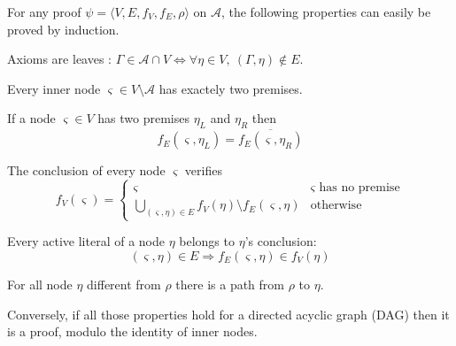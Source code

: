\documentclass{llncs}
\begin{document}
For any proof $\psi = \langle V,E,f_V,f_E,\rho \rangle$ on $\mathcal{A}$, the following properties
can easily be proved by induction.

\begin{property}
\label{prop:proof_leaf}
Axioms are leaves : $\Gamma \in \mathcal{A} \cap V \Leftrightarrow \forall \eta \in V ,~
(\Gamma,\eta) \notin E$.
\end{property}

\begin{property}
Every inner node $\varsigma \in V \setminus \mathcal{A}$ has exactely two premises.
\end{property}

\begin{property}
\label{prop:proof_edges}
If a node $\varsigma \in V$ has two premises $\eta_L$ and $\eta_R$ then
\begin{equation*}
f_E(\varsigma,\eta_L) = \overline{f_E(\varsigma,\eta_R)}
\end{equation*}
\end{property}

\begin{property}
\label{prop:proof_conclusion}
The conclusion of every node $\varsigma$ verifies
\begin{equation*}
  f_V(\varsigma) = \begin{cases}
    \varsigma & \varsigma \text{ has no premise} \\
    \bigcup_{(\varsigma,\eta) \in E}{f_V(\eta) \setminus f_E(\varsigma,\eta)} & \text{otherwise}
  \end{cases}
\end{equation*}
\end{property}

\begin{property}
Every active literal of a node $\eta$ belongs to $\eta$'s conclusion:
\begin{equation*}
  (\varsigma,\eta) \in E \Rightarrow f_E(\varsigma,\eta) \in f_V(\eta)
\end{equation*}
\end{property}

\begin{property}
For all node $\eta$ different from $\rho$ there is a path from $\rho$ to $\eta$.
\end{property}

Conversely, if all those properties hold for a directed acyclic graph (DAG) then it is a proof,
modulo the identity of inner nodes.
\end{document}
